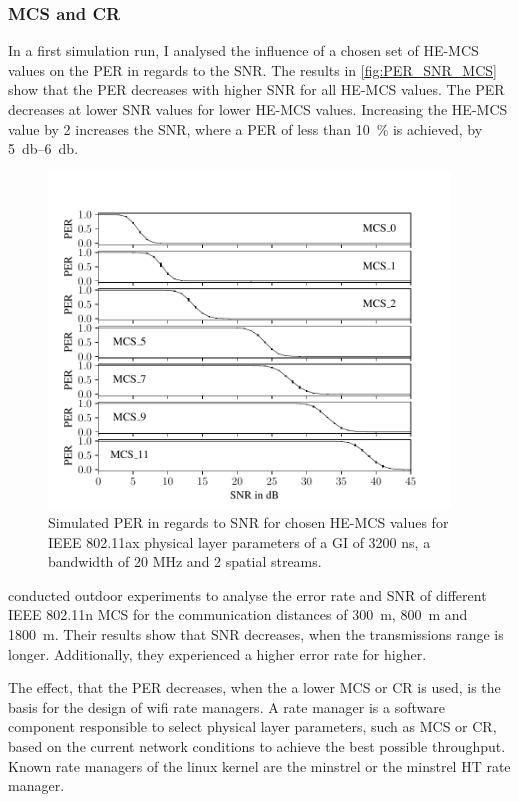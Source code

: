 \subsubsection*{\acf{MCS} and \acf{CR}}
In a first simulation run, I analysed the influence of a chosen set of HE-MCS values on the \ac{PER} in regards to the \ac{SNR}.
The results in \autoref{fig:PER_SNR_MCS} show that the \ac{PER} decreases with higher \ac{SNR} for all HE-MCS values. The
\ac{PER} decreases at lower \ac{SNR} values for lower HE-MCS values. Increasing the HE-MCS value by \num{2} increases the \ac{SNR}, where a \ac{PER} of less than
\SI{10}{\percent} is achieved, by \SIrange{5}{6}{\decibel}.
\begin{figure}[H]%
	\centering
	\includegraphics[width=0.95\textwidth]{figures/MCS_PER_to_SNR.pdf}
	\caption{Simulated PER in regards to SNR for chosen HE-MCS values for IEEE 802.11ax physical layer parameters
			of a GI of 3200 ns, a bandwidth of 20 MHz and 2 spatial streams.}
	\label{fig:PER_SNR_MCS}%
\end{figure}
\textcite{paul_characterizing_2011} conducted outdoor experiments to analyse the error rate and \ac{SNR} of different IEEE 802.11n \ac{MCS} for the
communication distances of \SI{300}{\meter}, \SI{800}{\meter} and \SI{1800}{\meter}. Their results show that \ac{SNR} decreases, when the transmissions range is longer.
Additionally, they experienced a higher error rate for higher.

The effect, that the \ac{PER} decreases, when the a lower \ac{MCS} or \ac{CR} is used, is the basis for the design of wifi rate managers.
A rate manager is a software component responsible to select physical layer parameters, such as \ac{MCS} or \ac{CR}, based on the current network conditions to
achieve the best possible throughput. Known rate managers of the linux kernel are the minstrel or the minstrel HT rate manager.


